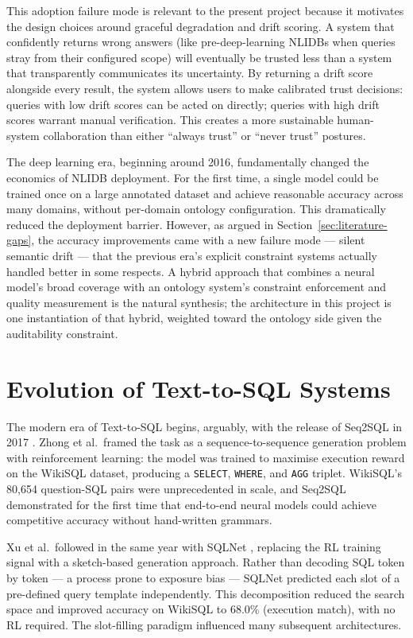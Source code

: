 \documentclass[12pt,a4paper]{report}
\begin{document}
This adoption failure mode is relevant to the present project because it motivates the design choices around graceful degradation and drift scoring. A system that confidently returns wrong answers (like pre-deep-learning NLIDBs when queries stray from their configured scope) will eventually be trusted less than a system that transparently communicates its uncertainty. By returning a drift score alongside every result, the system allows users to make calibrated trust decisions: queries with low drift scores can be acted on directly; queries with high drift scores warrant manual verification. This creates a more sustainable human-system collaboration than either ``always trust'' or ``never trust'' postures.

The deep learning era, beginning around 2016, fundamentally changed the economics of NLIDB deployment. For the first time, a single model could be trained once on a large annotated dataset and achieve reasonable accuracy across many domains, without per-domain ontology configuration. This dramatically reduced the deployment barrier. However, as argued in Section~\ref{sec:literature-gaps}, the accuracy improvements came with a new failure mode — silent semantic drift — that the previous era's explicit constraint systems actually handled better in some respects. A hybrid approach that combines a neural model's broad coverage with an ontology system's constraint enforcement and quality measurement is the natural synthesis; the architecture in this project is one instantiation of that hybrid, weighted toward the ontology side given the auditability constraint.

\section{Evolution of Text-to-SQL Systems}
\label{sec:text-to-sql-evolution}

The modern era of Text-to-SQL begins, arguably, with the release of Seq2SQL in 2017 \cite{seq2sql}. Zhong et al.\ framed the task as a sequence-to-sequence generation problem with reinforcement learning: the model was trained to maximise execution reward on the WikiSQL dataset, producing a \texttt{SELECT}, \texttt{WHERE}, and \texttt{AGG} triplet. WikiSQL's 80,654 question-SQL pairs were unprecedented in scale, and Seq2SQL demonstrated for the first time that end-to-end neural models could achieve competitive accuracy without hand-written grammars.

Xu et al.\ followed in the same year with SQLNet \cite{sqlnet}, replacing the \ac{RL} training signal with a sketch-based generation approach. Rather than decoding \ac{SQL} token by token — a process prone to exposure bias — SQLNet predicted each slot of a pre-defined query template independently. This decomposition reduced the search space and improved accuracy on WikiSQL to 68.0\% (execution match), with no \ac{RL} required. The slot-filling paradigm influenced many subsequent architectures.
\end{document}
